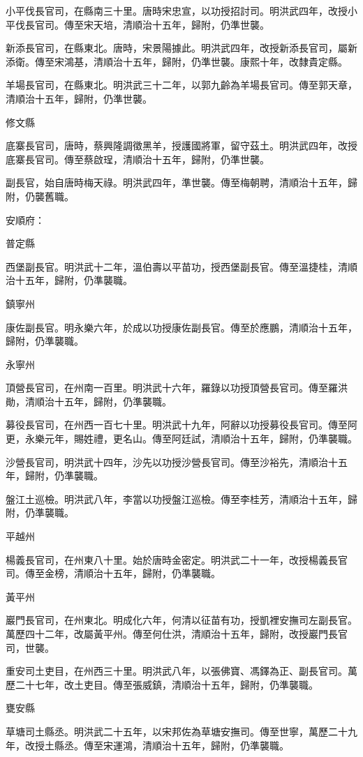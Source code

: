 \begin{pinyinscope}
小平伐長官司，在縣南三十里。唐時宋忠宣，以功授招討司。明洪武四年，改授小平伐長官司。傳至宋天培，清順治十五年，歸附，仍準世襲。

新添長官司，在縣東北。唐時，宋景陽據此。明洪武四年，改授新添長官司，屬新添衛。傳至宋鴻基，清順治十五年，歸附，仍準世襲。康熙十年，改隸貴定縣。

羊場長官司，在縣東北。明洪武三十二年，以郭九齡為羊場長官司。傳至郭天章，清順治十五年，歸附，仍準世襲。

修文縣

底寨長官司，唐時，蔡興隆調徵黑羊，授護國將軍，留守茲土。明洪武四年，改授底寨長官司。傳至蔡啟珵，清順治十五年，歸附，仍準世襲。

副長官，始自唐時梅天祿。明洪武四年，準世襲。傳至梅朝聘，清順治十五年，歸附，仍襲舊職。

安順府：

普定縣

西堡副長官。明洪武十二年，溫伯壽以平苗功，授西堡副長官。傳至溫捷桂，清順治十五年，歸附，仍準襲職。

鎮寧州

康佐副長官。明永樂六年，於成以功授康佐副長官。傳至於應鵬，清順治十五年，歸附，仍準襲職。

永寧州

頂營長官司，在州南一百里。明洪武十六年，羅錄以功授頂營長官司。傳至羅洪勛，清順治十五年，歸附，仍準襲職。

募役長官司，在州西一百七十里。明洪武十九年，阿辭以功授募役長官司。傳至阿更，永樂元年，賜姓禮，更名山。傳至阿廷試，清順治十五年，歸附，仍準襲職。

沙營長官司，明洪武十四年，沙先以功授沙營長官司。傳至沙裕先，清順治十五年，歸附，仍準襲職。

盤江土巡檢。明洪武八年，李當以功授盤江巡檢。傳至李桂芳，清順治十五年，歸附，仍準襲職。

平越州

楊義長官司，在州東八十里。始於唐時金密定。明洪武二十一年，改授楊義長官司。傳至金榜，清順治十五年，歸附，仍準襲職。

黃平州

巖門長官司，在州東北。明成化六年，何清以征苗有功，授凱裡安撫司左副長官。萬歷四十二年，改屬黃平州。傳至何仕洪，清順治十五年，歸附，改授巖門長官司，世襲。

重安司土吏目，在州西三十里。明洪武八年，以張佛寶、馮鐸為正、副長官司。萬歷二十七年，改土吏目。傳至張威鎮，清順治十五年，歸附，仍準襲職。

甕安縣

草塘司土縣丞。明洪武二十五年，以宋邦佐為草塘安撫司。傳至世寧，萬歷二十九年，改授土縣丞。傳至宋運鴻，清順治十五年，歸附，仍準襲職。


\end{pinyinscope}
